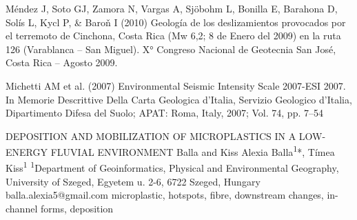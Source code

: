 {Méndez J, Soto GJ, Zamora N, Vargas A, Sjöbohm L, Bonilla E, Barahona D, Solís L, Kycl P, \& Baroň I (2010) Geología de los deslizamientos provocados por el terremoto de Cinchona, Costa Rica (Mw 6,2; 8 de Enero del 2009) en la ruta 126 (Varablanca – San Miguel). X° Congreso Nacional de Geotecnia  San José, Costa Rica -- Agosto 2009.

Michetti AM et al. (2007) Environmental Seismic Intensity Scale 2007-ESI 2007. In Memorie Descrittive Della Carta Geologica d’Italia, Servizio Geologico d’Italia, Dipartimento Difesa del Suolo; APAT: Roma, Italy, 2007; Vol. 74, pp. 7--54
}
\abstract
{DEPOSITION AND MOBILIZATION OF MICROPLASTICS IN A LOW-ENERGY FLUVIAL ENVIRONMENT} 
{Balla and Kiss} 
{Alexia Balla\textsuperscript{1}*, Tímea Kiss\textsuperscript{1}} 
{\TLtag} 
{
\textsuperscript{1}Department of Geoinformatics, Physical and Environmental Geography, University of Szeged, Egyetem u. 2-6, 6722 Szeged, Hungary
}
{balla.alexia5@gmail.com}  %
{microplastic, hotspots, fibre, downstream changes, in-channel forms, deposition}
